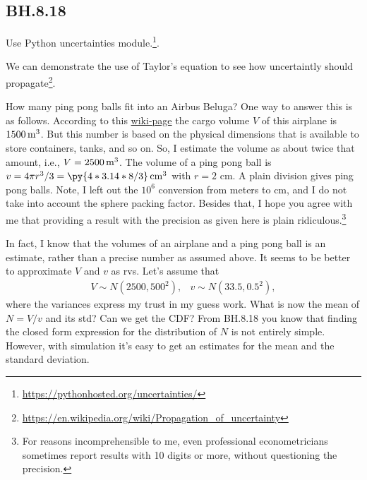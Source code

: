 \subsection{BH.8.18}


Use Python uncertainties module.\footnote{\url{https://pythonhosted.org/uncertainties/}}.


We can demonstrate the use of Taylor's equation to see how uncertaintly should propagate\footnote{\url{https://en.wikipedia.org/wiki/Propagation_of_uncertainty}}.



How many ping pong balls fit into an Airbus Beluga?
One way to answer this is as follows.
According to this \href{https://en.wikipedia.org/wiki/Airbus\_Beluga}{wiki-page} the cargo volume $V$ of this airplane is $1500 \,\mathrm{m}^{3}$.
But this number is based on the physical dimensions that is available to store containers, tanks, and so on.
So, I estimate the volume as about twice that amount, i.e., $V = 2500 \,\mathrm{m}^{3}$.
The volume of a ping pong ball is $v = 4 \pi r^3/3  = \py{4*3.14*8/3} \cm^{3}$ with $r=2$ cm.
A plain division gives  ping pong balls.
Note, I left out the $10^{6}$ conversion from meters to cm, and I do not take into  account the sphere packing factor.
Besides that, I hope you agree with me that providing a result with the precision as given here is plain ridiculous.\footnote{For reasons incomprehensible to me, even professional econometricians sometimes  report results with 10 digits or more, without questioning the precision.}


In fact, I know that the volumes of an airplane and a ping pong ball is an estimate, rather than a precise number as assumed above.
It seems to be better to approximate $V$ and $v$ as rvs.
Let's assume that
   \begin{align*}
V \sim N(2500, 500^{2}), & v \sim N(33.5, 0.5^{2}),
\end{align*}
where the variances express my trust in my guess work.
What is now the mean of $N = V/v$ and its std? Can we get the CDF?
From BH.8.18 you know that finding the closed form expression for the distribution of $N$ is not entirely simple.
However, with simulation it's easy to get an estimates for the mean and the standard deviation.


